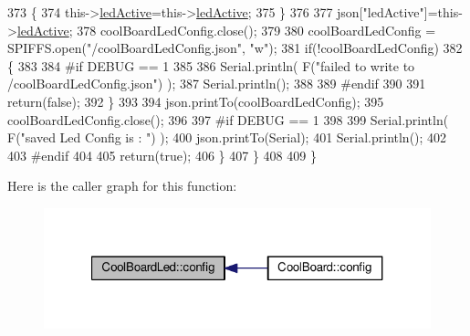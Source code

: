 \begin{DoxyCode}
373             \{
374                 this->\hyperlink{class_cool_board_led_aadd04d2ecf123247718d77f42fba7f08}{ledActive}=this->\hyperlink{class_cool_board_led_aadd04d2ecf123247718d77f42fba7f08}{ledActive};          
375             \}
376             
377             json[\textcolor{stringliteral}{"ledActive"}]=this->\hyperlink{class_cool_board_led_aadd04d2ecf123247718d77f42fba7f08}{ledActive};
378             coolBoardLedConfig.close();
379             
380             coolBoardLedConfig = SPIFFS.open(\textcolor{stringliteral}{"/coolBoardLedConfig.json"}, \textcolor{stringliteral}{"w"});
381             \textcolor{keywordflow}{if}(!coolBoardLedConfig)
382             \{
383             
384 \textcolor{preprocessor}{            #if DEBUG == 1 }
385 
386                 Serial.println( F(\textcolor{stringliteral}{"failed to write to /coolBoardLedConfig.json"}) );
387                 Serial.println();
388 
389 \textcolor{preprocessor}{            #endif}
390 
391                 \textcolor{keywordflow}{return}(\textcolor{keyword}{false});          
392             \}
393 
394             json.printTo(coolBoardLedConfig);
395             coolBoardLedConfig.close();
396 
397 \textcolor{preprocessor}{        #if DEBUG == 1}
398     
399             Serial.println( F(\textcolor{stringliteral}{"saved Led Config is : "}) );
400             json.printTo(Serial);
401             Serial.println();
402 
403 \textcolor{preprocessor}{        #endif}
404 
405             \textcolor{keywordflow}{return}(\textcolor{keyword}{true}); 
406         \}
407     \}   
408 
409 \}               
\end{DoxyCode}
Here is the caller graph for this function\+:\nopagebreak
\begin{figure}[H]
\begin{center}
\leavevmode
\includegraphics[width=321pt]{de/dc0/class_cool_board_led_a1b60e5e30bea96c49ed62ed1bf1ffc8b_icgraph}
\end{center}
\end{figure}
\mbox{\label{class_cool_board_led_a69f323359e0c9f797422f2152b5d41ef}} 
